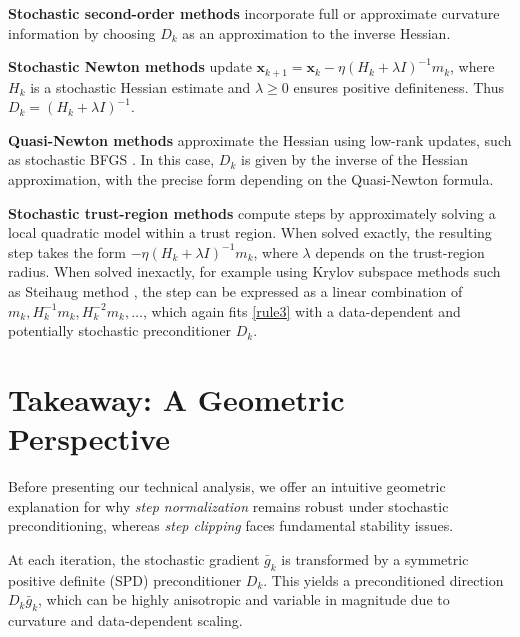 \documentclass{article}
\newcommand{\TODOO}[1]{\textbf{\color{red}[TODO: #1]}}
\newcommand{\bx}{\boldsymbol{x}}
\newcommand{\barg}{\bar{g}}
\theoremstyle{plain}
\theoremstyle{definition}
\theoremstyle{remark}
\begin{document}


\textbf{Stochastic second-order methods} incorporate full or approximate curvature information by choosing $D_k$
as an approximation to the inverse Hessian.

\textbf{Stochastic Newton methods} \citep{bottou2018optimization} update $\bx_{k+1} = \bx_k - \eta (H_k + \lambda I)^{-1} m_k$,
where $H_k$ is a stochastic Hessian estimate and $\lambda \ge 0$ ensures positive definiteness.
Thus $D_k = (H_k + \lambda I)^{-1}$.

\textbf{Quasi-Newton methods} approximate the Hessian using low-rank updates, such as stochastic BFGS \citep{Wang2017Stochastic}. In this case, $D_k$ is given by the inverse of the Hessian approximation, with the precise form depending on the Quasi-Newton formula.

\textbf{Stochastic trust-region methods} \citep{Curtis2022Fully} compute steps by approximately solving
a local quadratic model within a trust region. When solved exactly, the resulting step takes the form
$-\eta (H_k + \lambda I)^{-1} m_k$, where $\lambda$ depends on the trust-region radius. When solved inexactly, for example using Krylov subspace methods such as Steihaug method \citep[Algorithm 7.2]{Nocedal2006Numerical}, the step can be expressed as a linear combination of
$m_k, H_k^{-1}m_k, H_k^{-2}m_k,\ldots$, which again fits \eqref{rule3} with a data-dependent and potentially stochastic preconditioner $D_k$.










\section{Takeaway: A Geometric Perspective}

Before presenting our technical analysis, we offer an intuitive geometric explanation for why \emph{step normalization} remains robust under stochastic preconditioning, whereas \emph{step clipping} faces fundamental stability issues.

At each iteration, the stochastic gradient $\barg_k$ is transformed by a symmetric positive definite (SPD) preconditioner $D_k$. This yields a preconditioned direction $D_k \barg_k$, which can be highly anisotropic and variable in magnitude due to curvature and data-dependent scaling.
\end{document}
